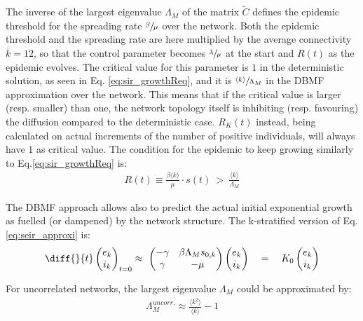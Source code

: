 \documentclass[DIV=12, BCOR=0pt]{scrartcl}  %
\begin{document}
  The inverse of the largest eigenvalue $\Lambda_M$ of the matrix $\tilde{C}$ defines the epidemic threshold for the spreading rate $\sfrac{\beta}{\mu}$ over the network. Both the epidemic threshold and the spreading rate are here multiplied by the average connectivity $\bar{k} = 12$, so that the control parameter becomes $\sfrac{\lambda}{\mu}$ at the start and $R(t)$ as the epidemic evolves. The critical value for this parameter is $1$ in the deterministic solution, as seen in Eq. \ref{eq:sir_growthReq}, and it is $\sfrac{\langle k \rangle}{\Lambda_M}$ in the DBMF approximation over the network. This means that if the critical value is larger (resp. smaller) than one, the network topology itself is inhibiting (resp. favouring) the diffusion compared to the deterministic case. $R_K(t)$ instead, being calculated on actual increments of the number of positive individuals, will always have $1$ as critical value. The condition for the epidemic to keep growing similarly to Eq.\ref{eq:sir_growthReq} is:
  \begin{align}
		 R(t) \equiv \frac{\beta \langle k \rangle }{\mu} \cdot s(t) \ > \ \frac{\langle k \rangle}{\Lambda_M}
  \end{align}
  
  The DBMF approach allows also to predict the actual initial exponential growth as fuelled (or dampened) by the network structure. The k-stratified version of Eq. \ref{eq:seir_approxi} is:
  \begin{align}
    	\diff{}{t}
	  \begin{pmatrix}
	  	e_k \\
	  	i_k
	  \end{pmatrix}_{t=0}
	  \approx \
	  \begin{pmatrix}
	  	- \gamma & \beta \Lambda_M s_{0,k} \\
	  	\gamma & - \mu
	  \end{pmatrix}
	  \begin{pmatrix}
	  	e_k \\
	  	i_k
	  \end{pmatrix}
	  \quad = \quad K_0 %
	  \begin{pmatrix}
	  	e_k \\
	  	i_k
	  \end{pmatrix} %
	  \label{eq:seir_approxiDBMF}
  \end{align}
  
  For uncorrelated networks, the largest eigenvalue $\Lambda_M$ could be approximated by:
  \begin{align}
  	\Lambda_M^{uncorr.} \approx \frac{\langle k^2 \rangle}{\langle k \rangle} - 1
  \end{align}
\end{document}
